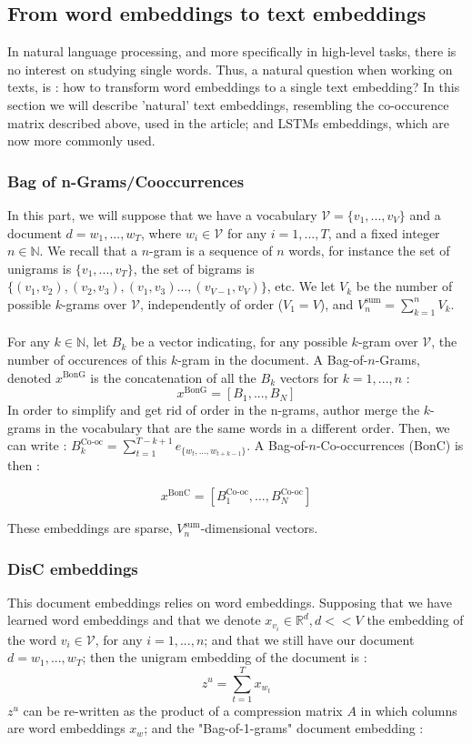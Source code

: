 \documentclass{article}
\newcommand{\N}{\mathbb N}
\newcommand{\R}{\mathbb R}
\begin{document}
\subsection{From word embeddings to text embeddings}

In natural language processing, and more specifically in 
high-level tasks, there is no interest on studying single words. 
Thus, a natural question when working on texts, is : how to 
transform word embeddings to a single text embedding? In this section
we will describe 'natural' text embeddings, resembling the co-occurence
matrix described above, used in the article; and LSTMs embeddings, 
which are now more commonly used.

\subsubsection{Bag of n-Grams/Cooccurrences}

In this part, we will suppose that we have a vocabulary 
$\mathcal{V} = \{ v_1, ..., v_V\}$ and a document $d=w_1, ..., w_T$, 
where $w_i \in \mathcal{V}$ for any $i=1, ..., T$, and a fixed integer 
$n\in \N$. We recall 
that a $n$-gram is a sequence of $n$ words, 
for instance the set of unigrams is $\{v_1, ..., v_T \}$, the set 
of bigrams is $\{(v_1,v_2), (v_2, v_3), (v_1, v_3) ..., (v_{V-1}, v_V) \}$, etc.
We let $V_k$ be the number of possible $k$-grams over $\mathcal{V}$,
independently of order ($V_1 = V$), and 
$V_n^{\text{sum}} = \sum_{k=1}^n V_k$.\\ \\
For any $k\in \N$, let $B_k$ be a vector indicating, 
for any possible $k$-gram over $\mathcal{V}$, the number 
of occurences of this $k$-gram in the document.
A Bag-of-$n$-Grams, denoted $x^{\text{BonG}}$ is the concatenation of all the $B_k$ vectors
for $k = 1, ..., n$ : 
\[
x^{\text{BonG}} = [B_1, ..., B_N]\]
In order to simplify and get rid of order in the n-grams, author
merge the $k$-grams in the vocabulary that are the same words in a 
different order. Then, we can write :
$B^{\text{Co-oc}}_k = \sum_{t=1}^{T-k+1} e_{ \{w_t, ..., w_{t+k-1}\}  }$. 
A Bag-of-$n$-Co-occurrences (BonC) is then :

\[
x^{\text{BonC}} = [B^{\text{Co-oc}}_1, ..., B^{\text{Co-oc}}_N]\]

These embeddings are sparse, $V_n^{\text{sum}}$-dimensional vectors.


\subsubsection{DisC embeddings}
This document embeddings relies on word embeddings. 
Supposing that we have learned word embeddings and that we denote
$x_{v_i} \in \R^d, d<<V$ the embedding of the word $v_i \in \mathcal{V}$, for any
$i=1,..., n$; and that we still have our document $d= w_1, ..., w_T$; 
then the unigram embedding of the document is :
\[z^u = \sum_{t=1}^T x_{w_t}\]
$z^u$ can be re-written as the product of a compression matrix $A$ 
in which columns are word embeddings $x_w$; and the "Bag-of-1-grams" document embedding : 
\end{document}
